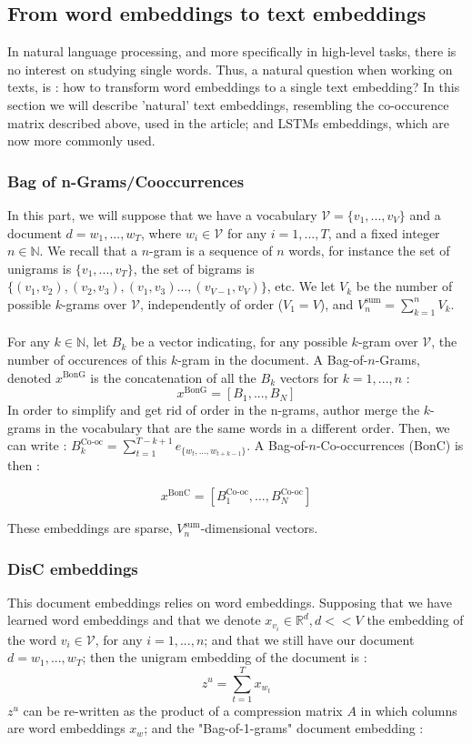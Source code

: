 \documentclass{article}
\newcommand{\N}{\mathbb N}
\newcommand{\R}{\mathbb R}
\begin{document}
\subsection{From word embeddings to text embeddings}

In natural language processing, and more specifically in 
high-level tasks, there is no interest on studying single words. 
Thus, a natural question when working on texts, is : how to 
transform word embeddings to a single text embedding? In this section
we will describe 'natural' text embeddings, resembling the co-occurence
matrix described above, used in the article; and LSTMs embeddings, 
which are now more commonly used.

\subsubsection{Bag of n-Grams/Cooccurrences}

In this part, we will suppose that we have a vocabulary 
$\mathcal{V} = \{ v_1, ..., v_V\}$ and a document $d=w_1, ..., w_T$, 
where $w_i \in \mathcal{V}$ for any $i=1, ..., T$, and a fixed integer 
$n\in \N$. We recall 
that a $n$-gram is a sequence of $n$ words, 
for instance the set of unigrams is $\{v_1, ..., v_T \}$, the set 
of bigrams is $\{(v_1,v_2), (v_2, v_3), (v_1, v_3) ..., (v_{V-1}, v_V) \}$, etc.
We let $V_k$ be the number of possible $k$-grams over $\mathcal{V}$,
independently of order ($V_1 = V$), and 
$V_n^{\text{sum}} = \sum_{k=1}^n V_k$.\\ \\
For any $k\in \N$, let $B_k$ be a vector indicating, 
for any possible $k$-gram over $\mathcal{V}$, the number 
of occurences of this $k$-gram in the document.
A Bag-of-$n$-Grams, denoted $x^{\text{BonG}}$ is the concatenation of all the $B_k$ vectors
for $k = 1, ..., n$ : 
\[
x^{\text{BonG}} = [B_1, ..., B_N]\]
In order to simplify and get rid of order in the n-grams, author
merge the $k$-grams in the vocabulary that are the same words in a 
different order. Then, we can write :
$B^{\text{Co-oc}}_k = \sum_{t=1}^{T-k+1} e_{ \{w_t, ..., w_{t+k-1}\}  }$. 
A Bag-of-$n$-Co-occurrences (BonC) is then :

\[
x^{\text{BonC}} = [B^{\text{Co-oc}}_1, ..., B^{\text{Co-oc}}_N]\]

These embeddings are sparse, $V_n^{\text{sum}}$-dimensional vectors.


\subsubsection{DisC embeddings}
This document embeddings relies on word embeddings. 
Supposing that we have learned word embeddings and that we denote
$x_{v_i} \in \R^d, d<<V$ the embedding of the word $v_i \in \mathcal{V}$, for any
$i=1,..., n$; and that we still have our document $d= w_1, ..., w_T$; 
then the unigram embedding of the document is :
\[z^u = \sum_{t=1}^T x_{w_t}\]
$z^u$ can be re-written as the product of a compression matrix $A$ 
in which columns are word embeddings $x_w$; and the "Bag-of-1-grams" document embedding : 
\end{document}
